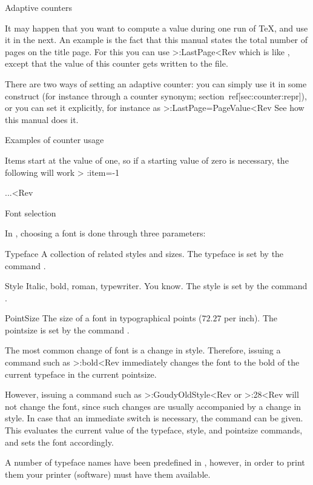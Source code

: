 \SubSection Adaptive counters

It may happen that you want to compute a value during one run of
\TeX, and use it in the next. An example is the fact that this manual
states the total number of pages on the title page. For this you can
use 
 \Ver>\AdaptiveCounter:LastPage<Rev
which is like , except that the value of this counter
gets written to the  file.

There are two ways of setting an adaptive counter: you can simply use
it in some construct (for instance through a counter synonym;
section~ref[sec:counter:repr]), or you can set it explicitly, for
instance as
 \Ver>\SetCounter:LastPage=PageValue<Rev
See how this manual does it.

\SubSection Examples of counter usage

Items start at the value of one, so if a starting value of zero is
necessary, the following will work
\Ver>
\Enumerate \SetCounter:item=-1
\item ...<Rev


 Font selection
 
In \Lollipop, choosing a font is done through three parameters:
\Description\item Typeface
A collection of related styles and sizes. The typeface is set by the
command .
\item Style
Italic, bold, roman, typewriter. You know. The style is set by the 
command .
\item PointSize
The size of a font in typographical points ($72.27$ per inch).
The pointsize is set by the command .
\>

The most common change of font is a change in style. Therefore,
issuing a command such as \Ver>\Style:bold<Rev immediately changes
the font to the bold of the current typeface in the current pointsize.

However, issuing a command such as \Ver>\Typeface:GoudyOldStyle<Rev
or \Ver>\PointSize:28<Rev will not change the font, since such
changes are usually accompanied by a change in style. In case that an
immediate switch is necessary, the command 
 can be given.
This evaluates the current value of the typeface, style, and
pointsize commands, and sets the font accordingly.

A number of typeface names have been predefined in \Lollipop,
however, in order to print them your printer (software) must have them
available.

